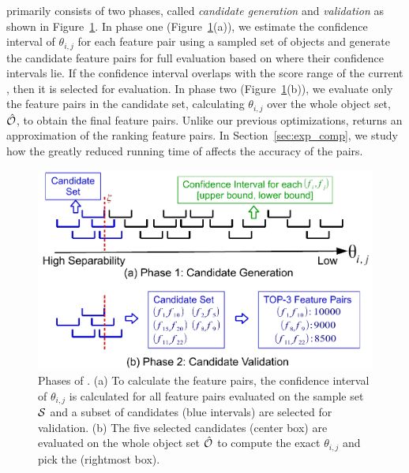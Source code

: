 \sampling primarily consists of two phases, 
called {\em candidate generation} and {\em validation} 
as shown in Figure~\ref{fig:sampling}. 
In phase one (Figure~\ref{fig:sampling}(a)), 
we estimate the confidence interval of $\theta_{i,j}$ 
for each feature pair using a sampled set of objects and 
generate the candidate feature pairs for full evaluation 
based on where their confidence intervals lie. 
If the confidence interval overlaps with the 
score range of the current \topk, then it is selected for evaluation. 
In phase two (Figure~\ref{fig:sampling}(b)), 
we evaluate only the feature pairs in the candidate set, 
calculating $\theta_{i,j}$ over the whole object set, $\hat{{\mathcal{O}}}$, 
to obtain the final \topk feature pairs. 
Unlike our previous optimizations, \sampling returns 
an approximation of the \topk ranking feature pairs. 
In Section~\ref{sec:exp_comp}, we study how the greatly 
reduced running time of \sampling affects the accuracy of the \topk pairs. %

\begin{figure}[t!]
 \centering
 \vspace{-2mm}
 \includegraphics[width=\linewidth]{fig/sampling.pdf}
 \vspace{-9mm}
\caption{Phases of \sampling. (a) To calculate the \topthree feature pairs, the confidence interval of $\theta_{i,j}$ is calculated for all feature pairs evaluated on the sample set ${\mathcal{S}}$ and a subset of candidates (blue intervals) are selected for validation. (b) The five selected candidates (center box) are evaluated on the whole object set $\hat{{\mathcal{O}}}$ to compute the exact $\theta_{i,j}$ and pick the \topthree (rightmost box).}
\vspace{-5mm}
\label{fig:sampling}
\end{figure}

